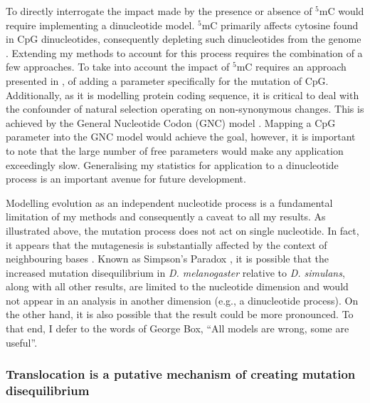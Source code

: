 To directly interrogate the impact made by the presence or absence of $^5$mC would require implementing a dinucleotide model. $^5$mC primarily affects cytosine found in CpG dinucleotides, consequently depleting such dinucleotides from the genome \citep{Holliday1975DNADevelopment, Bird1980DNADNA}. Extending my methods to account for this process requires the combination of a few approaches. To take into account the impact of $^5$mC requires an approach presented in \cite{Huttley2004ModelingMammals}, of adding a parameter specifically for the mutation of CpG. Additionally, as it is modelling protein coding sequence, it is critical to deal with the confounder of natural selection operating on non-synonymous changes. This is achieved by the General Nucleotide Codon (GNC) model \citep{Kaehler2017StandardData}. Mapping a CpG parameter into the GNC model would achieve the goal, however, it is important to note that the large number of free parameters would make any application exceedingly slow. Generalising my statistics for application to a dinucleotide process is an important avenue for future development. 

Modelling evolution as an independent nucleotide process is a fundamental limitation of my methods and consequently a caveat to all my results. As illustrated above, the mutation process does not act on single nucleotide. In fact, it appears that the mutagenesis is substantially affected by the context of neighbouring bases \citep{Zhu2020MachineMutations}. Known as Simpson's Paradox \citep{Simpson1951TheTables}, it is possible that the increased mutation disequilibrium in \textit{D. melanogaster} relative to \textit{D. simulans}, along with all other results, are limited to the nucleotide dimension and would not appear in an analysis in another dimension (e.g., a  dinucleotide process). On the other hand, it is also possible that the result could be more pronounced. To that end, I defer to the words of George Box, ``All models are wrong, some are useful''. 

\subsubsection{Translocation is a putative mechanism of creating mutation disequilibrium}

